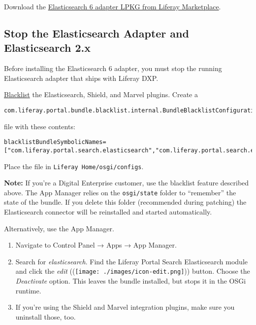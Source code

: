 Download the \href{https://web.liferay.com/marketplace}{Elasticsearch 6
adapter LPKG from Liferay Marketplace}.

\subsection{Stop the Elasticsearch Adapter and Elasticsearch
2.x}\label{stop-the-elasticsearch-adapter-and-elasticsearch-2.x}

Before installing the Elasticsearch 6 adapter, you must stop the running
Elasticsearch adapter that ships with Liferay DXP.

\href{/docs/7-0/user/-/knowledge_base/u/blacklisting-osgi-modules}{Blacklist}
the Elasticsearch, Shield, and Marvel plugins. Create a

\begin{verbatim}
com.liferay.portal.bundle.blacklist.internal.BundleBlacklistConfiguration.config
\end{verbatim}

file with these contents:

\begin{verbatim}
blacklistBundleSymbolicNames=["com.liferay.portal.search.elasticsearch","com.liferay.portal.search.elasticsearch.shield","com.liferay.portal.search.elasticsearch.marvel.web"]
\end{verbatim}

Place the file in \texttt{Liferay\ Home/osgi/configs}.

\noindent\hrulefill

\textbf{Note:} If you're a Digital Enterprise customer, use the
blacklist feature described above. The App Manager relies on the
\texttt{osgi/state} folder to ``remember'' the state of the bundle. If
you delete this folder (recommended during patching) the Elasticsearch
connector will be reinstalled and started automatically.

\noindent\hrulefill

Alternatively, use the App Manager.

\begin{enumerate}
\def\labelenumi{\arabic{enumi}.}
\item
  Navigate to Control Panel → Apps → App Manager.
\item
  Search for \emph{elasticsearch}. Find the Liferay Portal Search
  Elasticsearch module and click the \emph{edit}
  ((\texttt{[image: ./images/icon-edit.png]})) button. Choose the
  \emph{Deactivate} option. This leaves the bundle installed, but stops
  it in the OSGi runtime.
\item
  If you're using the Shield and Marvel integration plugins, make sure
  you uninstall those, too.
\end{enumerate}

